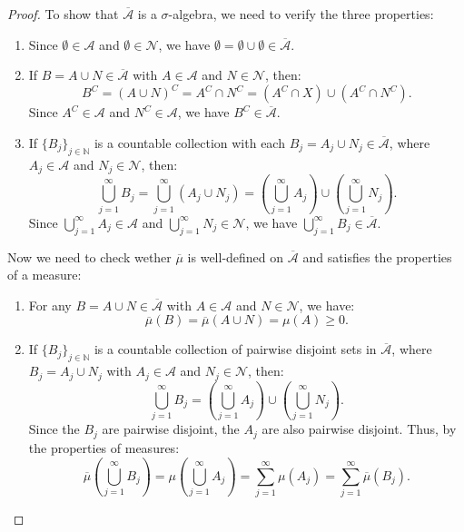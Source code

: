 \documentclass[11pt]{article}
\begin{document}
\begin{proof}
To show that \(\overline{\mathcal{A}}\) is a \(\sigma\)-algebra, we need to verify the three properties:
\begin{enumerate}
    \item Since \(\emptyset \in \mathcal{A}\) and \(\emptyset \in \mathcal{N}\), we have \(\emptyset = \emptyset \cup \emptyset \in \overline{\mathcal{A}}\).
    \item If \(B = A \cup N \in \overline{\mathcal{A}}\) with \(A \in \mathcal{A}\) and \(N \in \mathcal{N}\), then:
    \[B^C = (A \cup N)^C = A^C \cap N^C = (A^C \cap X) \cup (A^C \cap N^C).\]
    Since \(A^C \in \mathcal{A}\) and \(N^C \in \mathcal{A}\), we have \(B^C \in \overline{\mathcal{A}}\).
    \item If \(\{B_j\}_{j \in \mathbb{N}}\) is a countable collection with each \(B_j = A_j \cup N_j \in \overline{\mathcal{A}}\), where \(A_j \in \mathcal{A}\) and \(N_j \in \mathcal{N}\), then:
    \[
    \bigcup_{j=1}^{\infty} B_j = \bigcup_{j=1}^{\infty} (A_j \cup N_j) = \left(\bigcup_{j=1}^{\infty} A_j\right) \cup \left(\bigcup_{j=1}^{\infty} N_j\right).
    \]
    Since \(\bigcup_{j=1}^{\infty} A_j \in \mathcal{A}\) and \(\bigcup_{j=1}^{\infty} N_j \in \mathcal{N}\), we have \(\bigcup_{j=1}^{\infty} B_j \in \overline{\mathcal{A}}\). 
\end{enumerate}
Now we need to check wether \(\overline{\mu}\) is well-defined on \(\overline{\mathcal{A}}\) and satisfies the properties of a measure:
\begin{enumerate}
    \item For any \(B = A \cup N \in \overline{\mathcal{A}}\) with \(A \in \mathcal{A}\) and \(N \in \mathcal{N}\), we have:
    \[\overline{\mu}(B) = \overline{\mu}(A \cup N) = \mu(A) \geq 0.\]
    \item If \(\{B_j\}_{j \in \mathbb{N}}\) is a countable collection of pairwise disjoint sets in \(\overline{\mathcal{A}}\), where \(B_j = A_j \cup N_j\) with \(A_j \in \mathcal{A}\) and \(N_j \in \mathcal{N}\), then:
    \[\bigcup_{j=1}^{\infty} B_j = \left(\bigcup_{j=1}^{\infty} A_j\right) \cup \left(\bigcup_{j=1}^{\infty} N_j\right).\]
    Since the \(B_j\) are pairwise disjoint, the \(A_j\) are also pairwise disjoint. Thus, by the properties of measures:
    \[\overline{\mu}\left(\bigcup_{j=1}^{\infty} B_j\right) = \mu\left(\bigcup_{j=1}^{\infty} A_j\right) = \sum_{j=1}^{\infty} \mu(A_j) = \sum_{j=1}^{\infty} \overline{\mu}(B_j).\]
\end{enumerate}
\end{proof}
\end{document}
